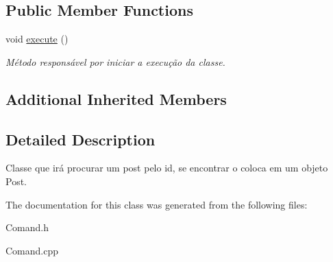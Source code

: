 \subsection*{Public Member Functions}
\begin{DoxyCompactItemize}
\item 
\hypertarget{class_command_find_post_a271fd0e0c327fe009caa71a4df92a454}{void \hyperlink{class_command_find_post_a271fd0e0c327fe009caa71a4df92a454}{execute} ()}\label{class_command_find_post_a271fd0e0c327fe009caa71a4df92a454}

\begin{DoxyCompactList}\small\item\em Método responsável por iniciar a execução da classe. \end{DoxyCompactList}\end{DoxyCompactItemize}
\subsection*{Additional Inherited Members}


\subsection{Detailed Description}
Classe que irá procurar um post pelo id, se encontrar o coloca em um objeto Post. 

The documentation for this class was generated from the following files\-:\begin{DoxyCompactItemize}
\item 
Comand.\-h\item 
Comand.\-cpp\end{DoxyCompactItemize}

